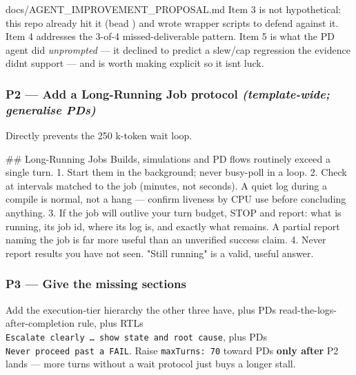 \begin{relocated}{docs/AGENT_IMPROVEMENT_PROPOSAL.md}
Item 3 is not hypothetical: this repo already hit it (bead )
and wrote wrapper scripts to defend against it. Item 4 addresses the
3-of-4 missed-deliverable pattern. Item 5 is what the PD agent did
\emph{unprompted} --- it declined to predict a slew/cap regression the
evidence didn\textquotesingle t support --- and is worth making explicit
so it isn\textquotesingle t luck.

\subsubsection{\texorpdfstring{P2 --- Add a Long-Running Job protocol
\emph{(template-wide; generalise
PD\textquotesingle s)}}{P2 --- Add a Long-Running Job protocol (template-wide; generalise PD\textquotesingle s)}}\label{tm:dec:agent-improvement-proposal:p2-add-a-long-running-job-protocol-template-wide-generalise-pds}

Directly prevents the 250 k-token wait loop.

\begin{textblock}
## Long-Running Jobs
Builds, simulations and PD flows routinely exceed a single turn.
1. Start them in the background; never busy-poll in a loop.
2. Check at intervals matched to the job (minutes, not seconds). A quiet log during a
   compile is normal, not a hang — confirm liveness by CPU use before concluding anything.
3. If the job will outlive your turn budget, STOP and report: what is running, its job id,
   where its log is, and exactly what remains. A partial report naming the job is far more
   useful than an unverified success claim.
4. Never report results you have not seen. "Still running" is a valid, useful answer.
\end{textblock}

\subsubsection{\texorpdfstring{P3 --- Give 
the missing sections}{P3 --- Give  the missing sections}}\label{tm:dec:agent-improvement-proposal:p3-give-firmware-orchestrator-the-missing-sections}

Add the execution-tier hierarchy the other three have, plus
PD\textquotesingle s read-the-logs-after-completion rule, plus
RTL\textquotesingle s
\texttt{Escalate\ clearly\ …\ show\ state\ and\ root\ cause}, plus
PD\textquotesingle s \texttt{Never\ proceed\ past\ a\ FAIL}. Raise
\texttt{maxTurns:\allowbreak{}\ 70} toward PD\textquotesingle s
 \textbf{only after} P2 lands --- more turns without a wait
protocol just buys a longer stall.


\end{relocated}
